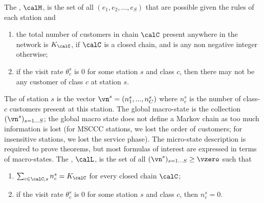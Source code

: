 \begin{petit}
 The ,
 $\calM$, is the set of all $(e_1, e_2, ...,
 e_S)$ that are possible given the rules of each
 station and
 \begin{enumerate}
    \item the total
 number of customers in chain $\calC$ present
 anywhere in the network is $K_{\calC}$, if $\calC$ is a closed chain, and is any
 non negative integer otherwise;
    \item  %
if the visit rate $\theta^s_c$ is $0$ for some
station $s$ and class $c$, then there may not be
any customer of class $c$ at station $s$.
\end{enumerate}


The  of station $s$ is the vector
$\vn^s=(n_1^s,...,n_C^s)$ where $n_c^s$ is the
number of class-$c$ customers present at this
station. The global macro-state is the collection
$(\vn^s)_{s=1...S}$; the global macro state does
not define a Markov chain as too much information
is lost (for MSCCC stations, we lost the order
of customers; for insensitive stations, we lost
the service phase). The micro-state description
is required to prove theorems, but most formulas
of interest are expressed in terms of
macro-states. The ,
$\calL$, is the set of all $(\vn^s)_{s=1...S}\geq
\vzero$ such that
\begin{enumerate}
    \item $\sum_{c \in \calC, s}n^s_c = K_{\calC}$ for
every closed chain $\calC$;
    \item  %
if the visit rate $\theta^s_c$ is $0$ for some
station $s$ and class $c$, then $n^s_c=0$.
\end{enumerate}


\end{petit}
